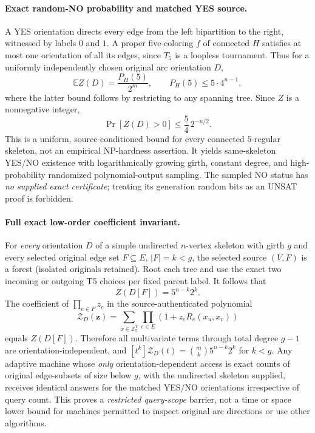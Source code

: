 \documentclass[11pt]{article}
\begin{document}
\paragraph{Exact random-NO probability and matched YES source.}
A YES orientation directs every edge from the left bipartition to
the right, witnessed by labels $0$ and $1$. A proper
five-coloring $f$ of connected $H$ satisfies at most one orientation
of all its edges, since $T_5$ is a loopless tournament.
Thus for a uniformly independently chosen original arc orientation
$D$,
\[
\mathbb E Z(D)=\frac{P_H(5)}{2^m},\qquad
P_H(5)\le 5\cdot4^{n-1},
\]
where the latter bound follows by restricting to any spanning tree.
Since $Z$ is a nonnegative integer,
\[
\boxed{\Pr[Z(D)>0]\le\frac54\,2^{-n/2}.}
\]
This is a uniform, source-conditioned bound for every connected
$5$-regular skeleton, not an empirical NP-hardness assertion.
It yields same-skeleton YES/NO existence with logarithmically
growing girth, constant degree, and high-probability randomized
polynomial-output sampling. The sampled NO status has
\emph{no supplied exact certificate}; treating its generation
random bits as an UNSAT proof is forbidden.

\paragraph{Full exact low-order coefficient invariant.}
For \emph{every} orientation $D$ of a simple undirected $n$-vertex
skeleton with girth $g$ and every selected original edge set
$F\subseteq E$, $|F|=k<g$, the selected source
$(V,F)$ is a forest (isolated originals retained).
Root each tree and use the exact two incoming or outgoing T5
choices per fixed parent label. It follows that
\[
\boxed{Z(D[F])=5^{n-k}2^k.}
\]
The coefficient of $\prod_{e\in F}z_e$ in the source-authenticated
polynomial
\[
\mathcal Z_D(\mathbf z)=
\sum_{x\in\mathbb Z_5^V}\prod_{e\in E}
(1+z_eR_e(x_u,x_v))
\]
equals $Z(D[F])$. Therefore all multivariate terms through
total degree $g-1$ are orientation-independent, and
$[t^k]\mathcal Z_D(t)=\binom mk5^{n-k}2^k$ for $k<g$.
Any adaptive machine whose \emph{only} orientation-dependent
access is exact counts of original edge-subsets of size below
$g$, with the undirected skeleton supplied, receives identical
answers for the matched YES/NO orientations irrespective of
query count. This proves a \emph{restricted query-scope}
barrier, not a time or space lower bound for machines permitted
to inspect original arc directions or use other algorithms.
\end{document}
